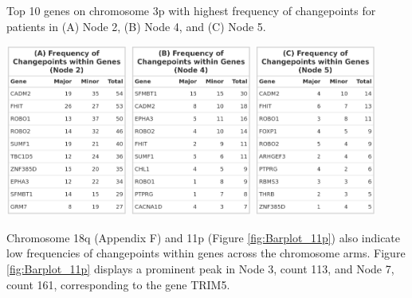 \begin{table}[!htb]
\caption[Top 10 genes on chromosome 3p with highest frequency of changepoints for patients in Nodes 2, 4 and 5.]{Top 10 genes on chromosome 3p with highest frequency of changepoints for patients in (A) Node 2, (B) Node 4, and (C) Node 5.}

\centering
\includegraphics[width = 0.3\textwidth]{../tables/Chapter_6/Chr3_Node_2.png}
\includegraphics[width = 0.3\textwidth]{../tables/Chapter_6/Chr3_Node_4.png}
\includegraphics[width = 0.3\textwidth]{../tables/Chapter_6/Chr3_Node_5.png}
\vspace{1cm}
\label{tbl:Chr3p_Freq}
\end{table}

Chromosome 18q (Appendix F) and 11p (Figure \ref{fig:Barplot_11p}) also indicate low frequencies of changepoints within genes across the chromosome arms. Figure \ref{fig:Barplot_11p} displays a prominent peak in Node 3, count 113, and Node 7, count 161, corresponding to the gene TRIM5. 

